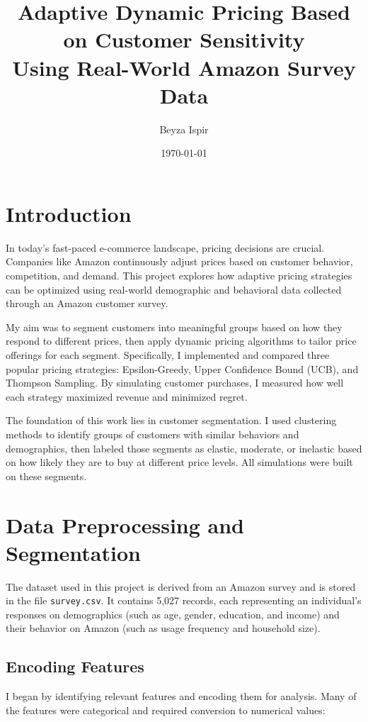 \documentclass[12pt]{article}
\title{Adaptive Dynamic Pricing Based on Customer Sensitivity\\ \large Using Real-World Amazon Survey Data}
\author{Beyza Ispir}
\date{\today}
\begin{document}
\maketitle

\section{Introduction}
In today’s fast-paced e-commerce landscape, pricing decisions are crucial. Companies like Amazon continuously adjust prices based on customer behavior, competition, and demand. This project explores how adaptive pricing strategies can be optimized using real-world demographic and behavioral data collected through an Amazon customer survey.

My aim was to segment customers into meaningful groups based on how they respond to different prices, then apply dynamic pricing algorithms to tailor price offerings for each segment. Specifically, I implemented and compared three popular pricing strategies: Epsilon-Greedy, Upper Confidence Bound (UCB), and Thompson Sampling. By simulating customer purchases, I measured how well each strategy maximized revenue and minimized regret.

The foundation of this work lies in customer segmentation. I used clustering methods to identify groups of customers with similar behaviors and demographics, then labeled those segments as elastic, moderate, or inelastic based on how likely they are to buy at different price levels. All simulations were built on these segments.

\section{Data Preprocessing and Segmentation}

The dataset used in this project is derived from an Amazon survey and is stored in the file \texttt{survey.csv}. It contains 5,027 records, each representing an individual's responses on demographics (such as age, gender, education, and income) and their behavior on Amazon (such as usage frequency and household size).

\subsection*{Encoding Features}
I began by identifying relevant features and encoding them for analysis. Many of the features were categorical and required conversion to numerical values:
\end{document}
